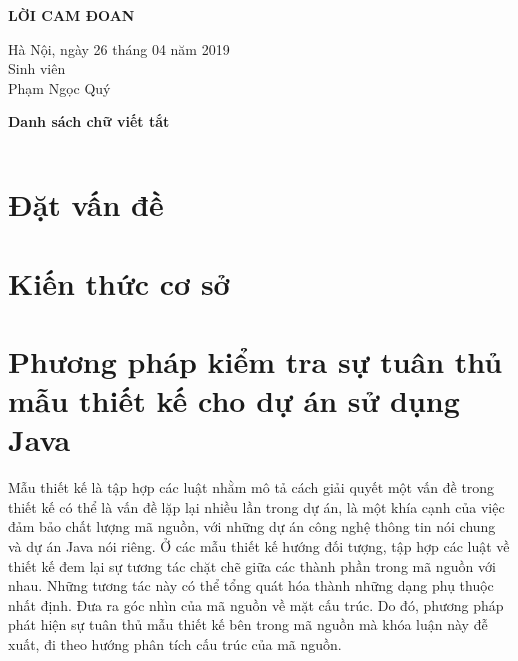 \documentclass[12pt]{report}
\begin{document}
\newpage
\begin{center}
	\textbf{\large LỜI CAM ĐOAN}
\end{center}


\begin{flushright}
	\begin{varwidth}{\linewidth}\centering
		Hà Nội, ngày 26 tháng 04 năm 2019\\
		Sinh viên\\[2cm]
		Phạm Ngọc Quý
	\end{varwidth}
\end{flushright}

\newpage
\tableofcontents

\newpage
{}
\listoftables

\newpage
{}
\begin{flushleft}
\bfseries{\Huge{Danh sách chữ viết tắt}}
\end{flushleft}
\begin{table}[h]
	\centering
	\begin{tabular}{lll}
	
	\end{tabular}
\end{table}

\newpage
{}
\listoffigures

\newpage
{}
\setcounter{page}{1}
\chapter{Đặt vấn đề}
\chapter{Kiến thức cơ sở}
\chapter{Phương pháp kiểm tra sự tuân thủ mẫu thiết kế cho dự án sử dụng Java}\noindent Mẫu thiết kế là tập hợp các luật nhằm mô tả cách giải quyết một vấn đề trong thiết kế có thể là vấn đề lặp lại nhiều lần trong dự án, là một khía cạnh của việc đảm bảo chất lượng mã nguồn, với những dự án công nghệ thông tin nói chung và dự án Java nói riêng. Ở các mẫu thiết kế hướng đối tượng, tập hợp các luật về thiết kế đem lại sự tương tác chặt chẽ giữa các thành phần trong mã nguồn với nhau. Những tương tác này có thể tổng quát hóa thành những dạng phụ thuộc nhất định. Đưa ra góc nhìn của mã nguồn về mặt cấu trúc. Do đó, phương pháp phát hiện sự tuân thủ mẫu thiết kế bên trong mã nguồn mà khóa luận này đễ xuất, đi theo hướng phân tích cấu trúc của mã nguồn.\\
\end{document}
